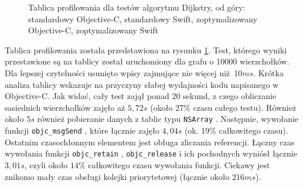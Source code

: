 \documentclass[mgr, shortabstract]{iithesis}
\newcommand{\objcinline}[1]{
    \texttt{#1}
}
\begin{document}
\begin{figure}
    \caption{Tablica profilowania dla testów algorytmu Dijkstry, od góry: standardowy Objective-C, standardowy Swift, zoptymalizowany Objective-C, zoptymalizowany Swift }
    \label{i:dijkstra}
\end{figure}

Tablica profilowania została przedstawiona na rysunku \ref{i:dijkstra}. Test, którego wyniki przestawione są na tablicy został uruchomiony dla grafu o 10000 wierzchołków. Dla lepszej czytelności usunięto wpisy zajmujące nie więcej niż 10$ms$. Krótka analiza tablicy wskazuje na przyczyny słabej wydajności kodu napisanego w Objective-C. Jak widać, cały test zajął ponad 20 sekund, z czego obliczanie sasiednich wierzchołków zajęło aż $5,72s$ (około 27\% czasu całego testu). Również około $5s$ również pobieranie danych z tablic typu \objcinline{NSArray}. Następnie, wywołanie funkcji \objcinline{objc_msgSend}, które łącznie zajęło $4,04s$ (ok. 19\% całkowitego czasu). Ostatnim czasochłonnym elementem jest obługa zliczania referencji. Łączny czas wywołania funkcji \objcinline{objc_retain}, \objcinline{objc_release} i ich pochodnych wyniósł łącznie $3,01s$, czyli około $14\%$ całkowitego czasu wywołania funkcji. Ciekawy jest znikomo mały czas obsługi kolejki priorytetowej (łącznie około $216ms$).
\end{document}
